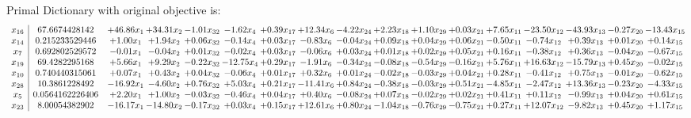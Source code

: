 \documentclass[9pt]{article}
\begin{document}
Primal Dictionary with original objective is:
\[\begin{array}{c| c c@{\hskip 2pt} c@{\hskip 2pt} c@{\hskip 2pt} c@{\hskip 2pt} c@{\hskip 2pt} c@{\hskip 2pt} c@{\hskip 2pt} c@{\hskip 2pt} c@{\hskip 2pt} c@{\hskip 2pt} c@{\hskip 2pt} c@{\hskip 2pt} c@{\hskip 2pt} c@{\hskip 2pt} c@{\hskip 2pt} }
 x_{16}   &  67.6674428142 & + 46.86 x_{1} & + 34.31 x_{2} & -1.01 x_{32} & -1.62 x_{4} & +  0.39 x_{17} & + 12.34 x_{6} & -4.22 x_{24} & +  2.23 x_{18} & +  1.10 x_{29} & +  0.03 x_{21} & +  7.65 x_{11} & -23.50 x_{12} & -43.93 x_{13} & -0.27 x_{20} & -13.43 x_{15}\\
 x_{14}   &  0.215233529446 & +  1.00 x_{1} & +  1.94 x_{2} & +  0.06 x_{32} & -0.14 x_{4} & +  0.03 x_{17} & -0.83 x_{6} & -0.04 x_{24} & +  0.09 x_{18} & +  0.04 x_{29} & +  0.06 x_{21} & -0.50 x_{11} & -0.74 x_{12} & +  0.39 x_{13} & +  0.01 x_{20} & +  0.14 x_{15}\\
 x_{7}   &  0.692802529572 & -0.01 x_{1} & -0.04 x_{2} & +  0.01 x_{32} & -0.02 x_{4} & +  0.03 x_{17} & -0.06 x_{6} & +  0.03 x_{24} & +  0.01 x_{18} & +  0.02 x_{29} & +  0.05 x_{21} & +  0.16 x_{11} & -0.38 x_{12} & +  0.36 x_{13} & -0.04 x_{20} & -0.67 x_{15}\\
 x_{19}   &  69.4282295168 & +  5.66 x_{1} & +  9.29 x_{2} & -0.22 x_{32} & -12.75 x_{4} & +  0.29 x_{17} & -1.91 x_{6} & -0.34 x_{24} & -0.08 x_{18} & -0.54 x_{29} & -0.16 x_{21} & +  5.76 x_{11} & + 16.63 x_{12} & -15.79 x_{13} & +  0.45 x_{20} & -0.02 x_{15}\\
 x_{10}   &  0.740440315061 & +  0.07 x_{1} & +  0.43 x_{2} & +  0.04 x_{32} & -0.06 x_{4} & +  0.01 x_{17} & +  0.32 x_{6} & +  0.01 x_{24} & -0.02 x_{18} & -0.03 x_{29} & +  0.04 x_{21} & +  0.28 x_{11} & -0.41 x_{12} & +  0.75 x_{13} & -0.01 x_{20} & -0.62 x_{15}\\
 x_{28}   &  10.3861228492 & -16.92 x_{1} & -4.60 x_{2} & +  0.76 x_{32} & +  5.03 x_{4} & +  0.21 x_{17} & -11.41 x_{6} & +  0.84 x_{24} & -0.38 x_{18} & -0.03 x_{29} & +  0.51 x_{21} & -4.85 x_{11} & -2.47 x_{12} & + 13.36 x_{13} & -0.23 x_{20} & -4.33 x_{15}\\
 x_{5}   &  0.0564162226406 & +  2.20 x_{1} & +  1.00 x_{2} & -0.03 x_{32} & -0.46 x_{4} & +  0.04 x_{17} & +  0.40 x_{6} & -0.08 x_{24} & +  0.07 x_{18} & -0.02 x_{29} & +  0.02 x_{21} & +  0.41 x_{11} & +  0.11 x_{12} & -0.99 x_{13} & +  0.04 x_{20} & +  0.61 x_{15}\\
 x_{23}   &  8.00054382902 & -16.17 x_{1} & -14.80 x_{2} & -0.17 x_{32} & +  0.03 x_{4} & +  0.15 x_{17} & + 12.61 x_{6} & +  0.80 x_{24} & -1.04 x_{18} & -0.76 x_{29} & -0.75 x_{21} & +  0.27 x_{11} & + 12.07 x_{12} & -9.82 x_{13} & +  0.45 x_{20} & +  1.17 x_{15}\\

\end{array}\]
\end{document}
